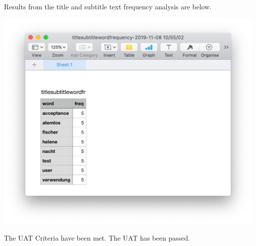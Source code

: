 \documentclass{article}
\begin{document}
Results from the title and subtitle text frequency analysis are below.

\includegraphics[width=\textwidth]{uat09.png}

The UAT Criteria have been met. The UAT has been passed.
\end{document}
